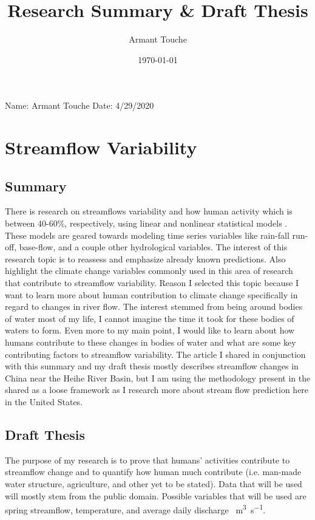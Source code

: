 \documentclass[a4paper,man,biblatex]{apa6}
\title{Research Summary \& Draft Thesis}
\author{Armant Touche}
\affiliation{Portland State University}
\date{\today}
\begin{document}
\thispagestyle{otherpage}
\setcounter{biburllcpenalty}{7000}
\setcounter{biburlucpenalty}{8000}


\noindent Name: Armant Touche\newline
\noindent Date: 4/29/2020
\section{Streamflow Variability}
\subsection{Summary} There is research on streamflows variability and how human activity which is between 40-60\%, respectively, using linear and nonlinear statistical models \autocite{streamflow}. These models are geared towards modeling time series variables like rain-fall run-off, base-flow, and a couple other hydrological variables. The interest of this research topic is to reassess and emphasize already known predictions. Also highlight the climate change variables commonly used in this area of research that contribute to streamflow variability. Reason I selected this topic because I want to learn more about human contribution to climate change specifically in regard to changes in river flow. The interest stemmed from being around bodies of water most of my life, I cannot imagine the time it took for these bodies of waters to form. Even more to my main point, I would like to learn about how humans contribute to these changes in bodies of water and what are some key contributing factors to streamflow variability. The article I shared in conjunction with this summary and my draft thesis mostly describes streamflow changes in China near the Heihe River Basin, but I am using the methodology present in the shared as a loose framework as I research more about stream flow prediction here in the United States.

\subsection{Draft Thesis} The purpose of my research is to prove that humans' activities contribute to streamflow change and to quantify how human much contribute (i.e. man-made water structure, agriculture, and other yet to be stated). Data that will be used will mostly stem from the public domain. Possible variables that will be used are spring streamflow, temperature, and average daily discharge \SI{}{\meter\cubed\per\second}. 

\printbibliography
\end{document}
